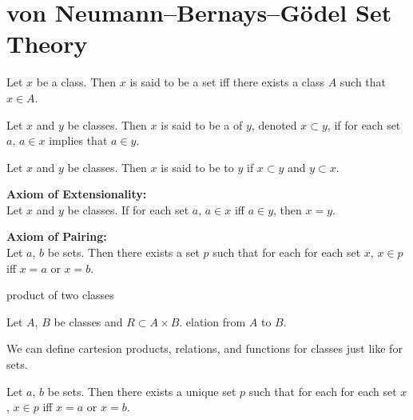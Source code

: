 \documentclass{book}
\begin{document}
	\section{von Neumann–Bernays–Gödel Set Theory}
	
	\begin{defn}  
		Let $x$ be a class. Then $x$ is said to be a set iff there exists a class $A$ such that $x \in A$. 
	\end{defn}

	\begin{defn}
		Let $x$ and $y$ be classes. Then $x$ is said to be a  of $y$, denoted $x \subset y$, if for each set $a$, $a \in x$ implies that $a \in y$. 
	\end{defn}

	\begin{defn}
		Let $x$ and $y$ be classes. Then $x$ is said to be  to $y$ if $x \subset y$ and $y \subset x$. 
	\end{defn}

	\begin{ax}  \textbf{Axiom of Extensionality:}  \\
		Let $x$ and $y$ be classes. If for each set $a$, $a \in x$ iff $a \in y$, then $x = y$.
	\end{ax}
	
	\begin{ax}  \textbf{Axiom of Pairing:}  \\
		Let $a$, $b$ be sets. Then there exists a set $p$ such that for each for each set $x$, $x \in p$ iff $x = a$ or $x = b$. 
	\end{ax}

	\begin{defn}
		product of two classes
	\end{defn}
	
	\begin{defn}
		Let $A$, $B$ be classes and $R \subset A \times B$. elation from $A$ to $B$.
	\end{defn}
	
	\begin{note}
		We can define cartesion products, relations, and functions for classes just like for sets. 
	\end{note}

	\begin{ex}
		Let $a$, $b$ be sets. Then there exists a unique set $p$ such that for each for each set $x$, $x \in p$ iff $x = a$ or $x = b$. 
	\end{ex}
	
\end{document}

